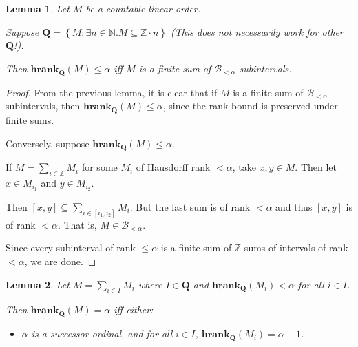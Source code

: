 \documentclass{article}
\newtheorem{lemma}{Lemma}
\newcommand{\braces}[1]{\left\{ {#1} \right\}}
\newcommand{\setcomp}[1]{\braces{#1}}
\newcommand{\hrank}[1]{\mathbf{hrank}_{\qq}\left( #1 \right)}
\newcommand{\qq}{\mathbf{Q}}
\newcommand{\NN}{\mathbb{N}}
\newcommand{\ZZ}{\mathbb{Z}}
\begin{document}
\begin{lemma}
  Let $M$ be a countable linear order.

  Suppose $\qq = \setcomp{M : \exists n \in \NN . M \subseteq \ZZ \cdot n}$
  (This does not necessarily work for other $\qq$!).

  Then $\hrank{M} \le \alpha$ iff $M$ is a finite sum of $\mathcal{B}_{< \alpha}$-subintervals.
\end{lemma}

\begin{proof}
  From the previous lemma, it is clear that if $M$ is a finite sum of $\mathcal{B}_{< \alpha}$-subintervals,
  then $\hrank{M} \le \alpha$, since the rank bound is preserved under finite sums.

  Conversely, suppose $\hrank{M} \le \alpha$.

  If $M = \sum_{i \in \ZZ} M_i$ for some $M_i$ of Hausdorff rank $< \alpha$,
  take $x, y \in M$. Then let $x \in M_{i_1}$ and $y \in M_{i_2}$.

  Then $[x, y] \subseteq \sum_{i \in [i_1, i_2]} M_i$. But the last sum is of rank $< \alpha$
  and thus $[x, y]$ is of rank $< \alpha$. That is, $M \in \mathcal{B}_{< \alpha}$.

  Since every subinterval of rank $\le \alpha$ is a finite sum of $\ZZ$-sums of intervals of rank $< \alpha$,
  we are done.
\end{proof}

\begin{lemma}
  Let $M = \sum_{i \in I} M_i$ where $I \in \qq$ and $\hrank{M_i} < \alpha$ for all $i \in I$.

  Then $\hrank{M} = \alpha$ iff either:

  \begin{itemize}
    \item $\alpha$ is a successor ordinal, and for all $i \in I$, $\hrank{M_i} = \alpha - 1$.
  \end{itemize}
\end{lemma}
\end{document}
